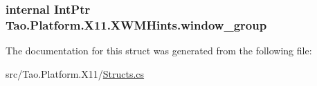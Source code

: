 \label{struct_tao_1_1_platform_1_1_x11_1_1_x_w_m_hints_a1fd34eaf44522ebdf78e696a37c93d35}
\hypertarget{struct_tao_1_1_platform_1_1_x11_1_1_x_w_m_hints_a66a886ae6542fde05c118856c740fa26}{
\subsubsection[{window\_\-group}]{\setlength{\rightskip}{0pt plus 5cm}internal IntPtr {\bf Tao.Platform.X11.XWMHints.window\_\-group}}}
\label{struct_tao_1_1_platform_1_1_x11_1_1_x_w_m_hints_a66a886ae6542fde05c118856c740fa26}


The documentation for this struct was generated from the following file:\begin{DoxyCompactItemize}
\item 
src/Tao.Platform.X11/\hyperlink{_structs_8cs}{Structs.cs}\end{DoxyCompactItemize}
